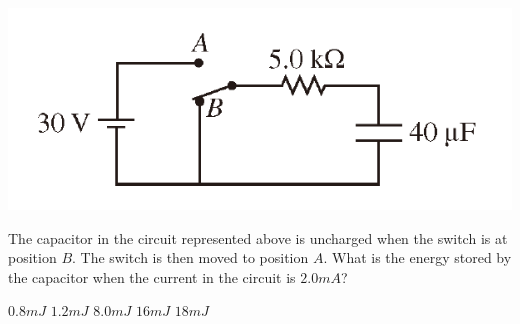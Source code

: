 
\begin{center}
    \includegraphics[scale=0.5]{images/18.png}
\end{center}

\begin{questions}
\setcounter{question}{17}

\question
The capacitor in the circuit represented above is uncharged when the switch is at position $B$. The switch is then moved to position $A$. What is the energy stored by the capacitor when the current in the circuit is $2.0 \unit{mA}$?

\begin{oneparchoices}
    \choice $0.8 \unit{mJ}$
    \choice $1.2 \unit{mJ}$
    \choice $8.0 \unit{mJ}$
    \choice $16 \unit{mJ}$
    \choice $18 \unit{mJ}$
\end{oneparchoices}

\end{questions}
